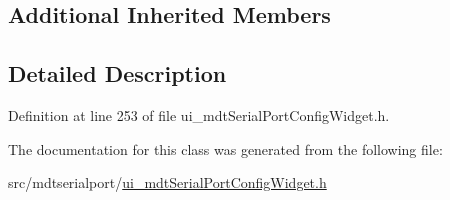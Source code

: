 \subsection*{Additional Inherited Members}


\subsection{Detailed Description}


Definition at line 253 of file ui\-\_\-mdt\-Serial\-Port\-Config\-Widget.\-h.



The documentation for this class was generated from the following file\-:\begin{DoxyCompactItemize}
\item 
src/mdtserialport/\hyperlink{ui__mdt_serial_port_config_widget_8h}{ui\-\_\-mdt\-Serial\-Port\-Config\-Widget.\-h}\end{DoxyCompactItemize}

